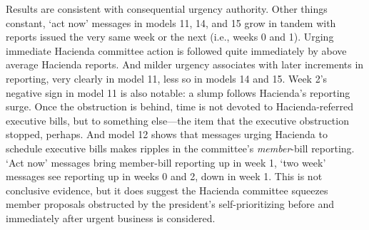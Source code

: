 \documentclass[letter,12pt]{article}
\begin{document}
Results are consistent with consequential urgency authority. Other things constant, `act now' messages in models 11, 14, and 15 grow in tandem with reports issued the very same week or the next (i.e., weeks 0 and 1). Urging immediate Hacienda committee action is followed quite immediately by above average Hacienda reports. And milder urgency associates with later increments in reporting, very clearly in model 11, less so in models 14 and 15. Week 2's negative sign in model 11 is also notable: a slump follows Hacienda's reporting surge. Once the obstruction is behind, time is not devoted to Hacienda-referred executive bills, but to something else---the item that the executive obstruction stopped, perhaps. And model 12 shows that messages urging Hacienda to schedule executive bills makes ripples in the committee's \emph{member}-bill reporting. `Act now' messages bring member-bill reporting up in week 1, `two week' messages see reporting up in weeks 0 and 2, down in week 1. This is not conclusive evidence, but it does suggest the Hacienda committee squeezes member proposals obstructed by the president's self-prioritizing before and immediately after urgent business is considered. 










\end{document}
